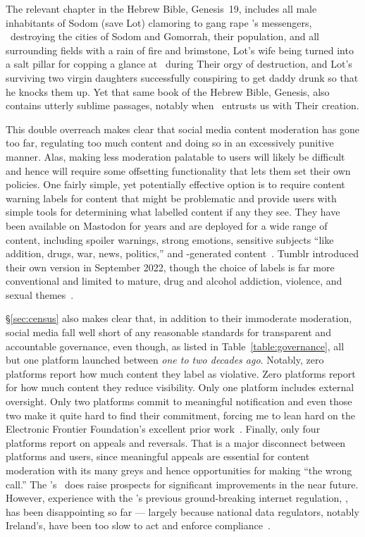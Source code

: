 The relevant chapter in the Hebrew Bible, Genesis~19, includes all male
inhabitants of Sodom (save Lot) clamoring to gang rape \YHWH's messengers,
\YHWH\ destroying the cities of Sodom and Gomorrah, their population, and all
surrounding fields with a rain of fire and brimstone, Lot's wife being turned
into a salt pillar for copping a glance at \YHWH\ during Their orgy of
destruction, and Lot's surviving two virgin daughters successfully conspiring to
get daddy drunk so that he knocks them up. Yet that same book of the Hebrew
Bible, Genesis, also contains utterly sublime passages, notably when \YHWH\
entrusts us with Their creation.

This double overreach makes clear that social media content moderation has gone
too far, regulating too much content and doing so in an excessively punitive
manner. Alas, making less moderation palatable to users will likely be difficult
and hence will require some offsetting functionality that lets them set their
own policies. One fairly simple, yet potentially effective option is to require
content warning labels for content that might be problematic and provide users
with simple tools for determining what labelled content if any they see. They
have been available on Mastodon for years and are deployed for a wide range of
content, including spoiler warnings, strong emotions, sensitive subjects ``like
addition, drugs, war, news, politics,'' and \AI-generated
content~\cite{Maloki2022,Sheehan2022,Voit2022}. Tumblr introduced their own
version in September 2022, though the choice of labels is far more conventional
and limited to mature, drug and alcohol addiction, violence, and sexual
themes~\cite{Tumblr2022}.

\S\ref{sec:census} also makes clear that, in addition to their immoderate
moderation, social media fall well short of any reasonable standards for
transparent and accountable governance, even though, as listed in
Table~\ref{table:governance}, all but one platform launched between \emph{one to
two decades ago}. Notably, zero platforms report how much content they label as
violative. Zero platforms report for how much content they reduce visibility.
Only one platform includes external oversight. Only two platforms commit to
meaningful notification and even those two make it quite hard to find their
commitment, forcing me to lean hard on the Electronic Frontier Foundation's
excellent prior work~\cite{CrockerGebhartea2019}. Finally, only four platforms
report on appeals and reversals. That is a major disconnect between platforms
and users, since meaningful appeals are essential for content moderation with
its many greys and hence opportunities for making ``the wrong call.'' The \EU's
\DSA\ does raise prospects for significant improvements in the near future.
However, experience with the \EU's previous ground-breaking internet regulation,
\GDPR, has been disappointing so far --- largely because national data
regulators, notably Ireland's, have been too slow to act and enforce
compliance~\cite{Burgess2022}.

